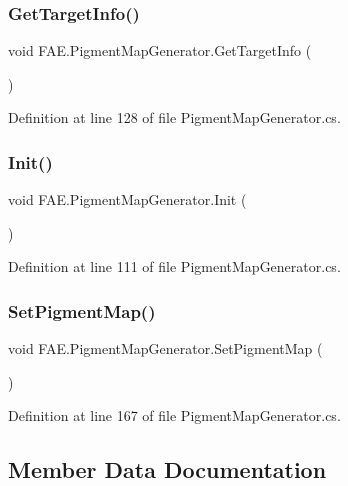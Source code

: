 \subsubsection{Get\+Target\+Info()}
{\footnotesize\ttfamily void F\+A\+E.\+Pigment\+Map\+Generator.\+Get\+Target\+Info (\begin{DoxyParamCaption}{ }\end{DoxyParamCaption})}



Definition at line 128 of file Pigment\+Map\+Generator.\+cs.

\mbox{\label{class_f_a_e_1_1_pigment_map_generator_ab830796a1c5b9d81e266b80a077c6e1b}} 
\subsubsection{Init()}
{\footnotesize\ttfamily void F\+A\+E.\+Pigment\+Map\+Generator.\+Init (\begin{DoxyParamCaption}{ }\end{DoxyParamCaption})}



Definition at line 111 of file Pigment\+Map\+Generator.\+cs.

\mbox{\label{class_f_a_e_1_1_pigment_map_generator_a803a79952cdc4f60630c50bba9b9456d}} 
\subsubsection{Set\+Pigment\+Map()}
{\footnotesize\ttfamily void F\+A\+E.\+Pigment\+Map\+Generator.\+Set\+Pigment\+Map (\begin{DoxyParamCaption}{ }\end{DoxyParamCaption})}



Definition at line 167 of file Pigment\+Map\+Generator.\+cs.



\subsection{Member Data Documentation}
\mbox{\label{class_f_a_e_1_1_pigment_map_generator_a384957632765fe4e66ebc6e4bade7694}} 
